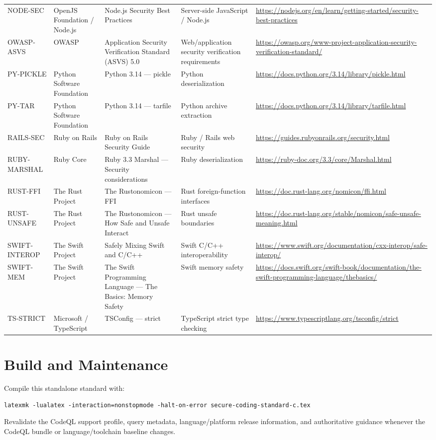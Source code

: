 \documentclass[10pt,letterpaper]{article}
\begin{document}
\begin{landscape}
\begin{longtable}{@{}P{0.82in}P{1.23in}P{2.25in}P{1.7in}P{3.0in}@{}}
NODE-SEC & OpenJS Foundation / Node.js & Node.js Security Best Practices & Server-side JavaScript / Node.js & \url{https://nodejs.org/en/learn/getting-started/security-best-practices}\\
OWASP-ASVS & OWASP & Application Security Verification Standard (ASVS) 5.0 & Web/application security verification requirements & \url{https://owasp.org/www-project-application-security-verification-standard/}\\
PY-PICKLE & Python Software Foundation & Python 3.14 --- pickle & Python deserialization & \url{https://docs.python.org/3.14/library/pickle.html}\\
PY-TAR & Python Software Foundation & Python 3.14 --- tarfile & Python archive extraction & \url{https://docs.python.org/3.14/library/tarfile.html}\\
RAILS-SEC & Ruby on Rails & Ruby on Rails Security Guide & Ruby / Rails web security & \url{https://guides.rubyonrails.org/security.html}\\
RUBY-MARSHAL & Ruby Core & Ruby 3.3 Marshal --- Security considerations & Ruby deserialization & \url{https://ruby-doc.org/3.3/core/Marshal.html}\\
RUST-FFI & The Rust Project & The Rustonomicon --- FFI & Rust foreign-function interfaces & \url{https://doc.rust-lang.org/nomicon/ffi.html}\\
RUST-UNSAFE & The Rust Project & The Rustonomicon --- How Safe and Unsafe Interact & Rust unsafe boundaries & \url{https://doc.rust-lang.org/stable/nomicon/safe-unsafe-meaning.html}\\
SWIFT-INTEROP & The Swift Project & Safely Mixing Swift and C/C++ & Swift C/C++ interoperability & \url{https://www.swift.org/documentation/cxx-interop/safe-interop/}\\
SWIFT-MEM & The Swift Project & The Swift Programming Language --- The Basics: Memory Safety & Swift memory safety & \url{https://docs.swift.org/swift-book/documentation/the-swift-programming-language/thebasics/}\\
TS-STRICT & Microsoft / TypeScript & TSConfig --- strict & TypeScript strict type checking & \url{https://www.typescriptlang.org/tsconfig/strict}\\
\bottomrule
\end{longtable}
\normalsize
\end{landscape}

\appendix
\section{Build and Maintenance}
Compile this standalone standard with:
\begin{lstlisting}
latexmk -lualatex -interaction=nonstopmode -halt-on-error secure-coding-standard-c.tex
\end{lstlisting}
Revalidate the CodeQL support profile, query metadata, language/platform release information, and authoritative guidance whenever the CodeQL bundle or language/toolchain baseline changes.
\end{document}
